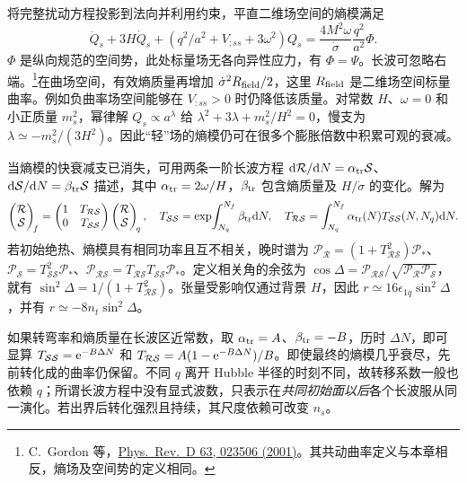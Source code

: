 将完整扰动方程投影到法向并利用约束，平直二维场空间的熵模满足
\[
 \ddot Q_s+3H\dot Q_s+
 (q^2/a^2+V_{;ss}+3\omega^2)Q_s
 =\frac{4M^2\omega}{\dot\sigma}\frac{q^2}{a^2}\Phi .
\]
$\Phi$ 是纵向规范的空间势，此处标量场无各向异性应力，有 $\Phi=\Psi$。长波可忽略右端。\footnote{C.~Gordon 等，\href{https://arxiv.org/abs/astro-ph/0009131}{Phys.\ Rev.\ D 63, 023506 (2001)}。其共动曲率定义与本章相反，熵场及空间势的定义相同。}在曲场空间，有效熵质量再增加 $\dot\sigma^2R_{\rm field}/2$，这里 $R_{\rm field}$ 是二维场空间标量曲率。例如负曲率场空间能够在 $V_{;ss}>0$ 时仍降低该质量。对常数 $H$、$\omega=0$ 和小正质量 $m_s^2$，幂律解 $Q_s\propto a^\lambda$ 给 $\lambda^2+3\lambda+m_s^2/H^2=0$，慢支为 $\lambda\simeq-m_s^2/(3H^2)$。因此“轻”场的熵模仍可在很多个膨胀倍数中积累可观的衰减。

当熵模的快衰减支已消失，可用两条一阶长波方程 $\dd\mathcal R/\dd N=\alpha_{\rm tr}\mathcal S$、$\dd\mathcal S/\dd N=\beta_{\rm tr}\mathcal S$ 描述，其中 $\alpha_{\rm tr}=2\omega/H$，$\beta_{\rm tr}$ 包含熵质量及 $H/\dot\sigma$ 的变化。解为
\begin{equation}\label{eq:cosmo-inf-transfer-matrix}
 \begin{pmatrix}\mathcal R\\\mathcal S\end{pmatrix}_{\!f}
 =\begin{pmatrix}1&T_{\mathcal R\mathcal S}\\0&T_{\mathcal S\mathcal S}\end{pmatrix}
 \begin{pmatrix}\mathcal R\\\mathcal S\end{pmatrix}_{\!q},\quad
 T_{\mathcal S\mathcal S}=\exp\!\int_{N_q}^{N_f}\beta_{\rm tr}\dd N,\quad
 T_{\mathcal R\mathcal S}=
 \int_{N_q}^{N_f}\alpha_{\rm tr}(N)T_{\mathcal S\mathcal S}(N,N_q)\dd N .
\end{equation}
若初始绝热、熵模具有相同功率且互不相关，晚时谱为 $\mathcal P_{\mathcal R}=(1+T_{\mathcal R\mathcal S}^2)\mathcal P_*$、$\mathcal P_{\mathcal S}=T_{\mathcal S\mathcal S}^2\mathcal P_*$、$\mathcal P_{\mathcal R\mathcal S}=T_{\mathcal R\mathcal S}T_{\mathcal S\mathcal S}\mathcal P_*$。定义相关角的余弦为 $\cos\Delta=\mathcal P_{\mathcal R\mathcal S}/\sqrt{\mathcal P_{\mathcal R}\mathcal P_{\mathcal S}}$，就有 $\sin^2\Delta=1/(1+T_{\mathcal R\mathcal S}^2)$。张量受影响仅通过背景 $H$，因此 $r\simeq16\epsilon_{1q}\sin^2\Delta$，并有 $r\simeq-8n_t\sin^2\Delta$。

如果转弯率和熵质量在长波区近常数，取 $\alpha_{\rm tr}=A$、$\beta_{\rm tr}=-B$，历时 $\Delta N$，即可显算 $T_{\mathcal S\mathcal S}=\mathrm{e}^{-B\Delta N}$ 和 $T_{\mathcal R\mathcal S}=A(1-\mathrm{e}^{-B\Delta N})/B$。即使最终的熵模几乎衰尽，先前转化成的曲率仍保留。不同 $q$ 离开 Hubble 半径的时刻不同，故转移系数一般也依赖 $q$；所谓长波方程中没有显式波数，只表示在\emph{共同初始面以后}各个长波服从同一演化。若出界后转化强烈且持续，其尺度依赖可改变 $n_s$。

